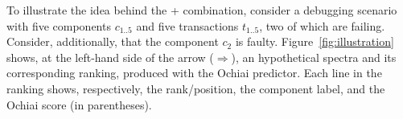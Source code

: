 \documentclass{article}
\begin{document}

To illustrate the idea behind the \sfl{}+\cs{} combination, consider a
debugging scenario with five components $c_{1..5}$ and five
transactions $t_{1..5}$, two of which are failing. Consider,
additionally, that the component $c_2$ is faulty.
Figure~\ref{fig:illustration} shows, at the left-hand side of the
arrow ($\Rightarrow$), an hypothetical spectra and its corresponding
ranking, produced with the Ochiai predictor. Each line in the ranking
shows, respectively, the rank/position, the component label, and the
Ochiai score (in parentheses).
\end{document}
